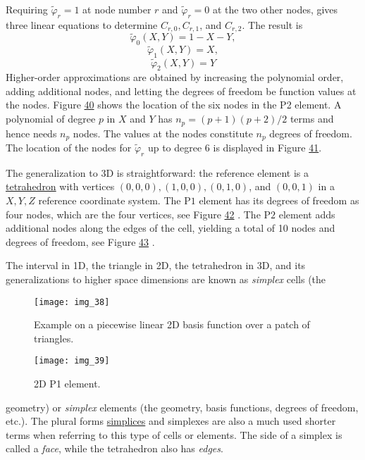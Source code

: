 \documentclass[../main.tex]{subfiles}
\begin{document}
Requiring $\tilde{\varphi}_{r}=1$ at node number $r$ and $\tilde{\varphi}_{r}=0$ at the two other nodes, gives three linear equations to determine $C_{r, 0}, C_{r, 1}$, and $C_{r, 2}$. The result is
\begin{equation}\label{eqa109}
	\tilde{\varphi}_{0}(X, Y)=1-X-Y,
\end{equation}
\begin{equation}\label{eqa110}
	\tilde{\varphi}_{1}(X, Y)=X,
\end{equation}
\begin{equation}\label{eqa111}
	\tilde{\varphi}_{2}(X, Y)=Y
\end{equation}
Higher-order approximations are obtained by increasing the polynomial order, adding additional nodes, and letting the degrees of freedom be function values at the nodes. Figure \hyperref[fig:img_40]{40} shows the location of the six nodes in the P2 element.
A polynomial of degree $p$ in $X$ and $Y$ has $n_{p}=(p+1)(p+2) / 2$ terms and hence needs $n_{p}$ nodes. The values at the nodes constitute $n_{p}$ degrees of freedom. The location of the nodes for $\tilde{\varphi}_{r}$ up to degree 6 is displayed in Figure \hyperref[fig:img_41]{41}.

The generalization to $3 \mathrm{D}$ is straightforward: the reference element is a \href{https://en.wikipedia.org/wiki/Tetrahedron}{tetrahedron} with vertices $(0,0,0),(1,0,0),(0,1,0)$, and $(0,0,1)$ in a $X, Y, Z$ reference coordinate system. The $\mathrm{P} 1$ element has its degrees of freedom as four nodes, which are the four vertices, see Figure \hyperref[fig:img_42]{42} . The $\mathrm{P} 2$ element adds additional nodes along the edges of the cell, yielding a total of 10 nodes and degrees of freedom, see Figure \hyperref[fig:img_43]{43} .

The interval in 1D, the triangle in 2D, the tetrahedron in 3D, and its generalizations to higher space dimensions are known as \textit{simplex} cells (the
\begin{figure}[H]
	\centering
	\texttt{[image: img\_38]}
	\caption{Example on a piecewise linear 2D basis function over a patch of
		triangles.}
	\label{fig:img_38}
\end{figure}
\begin{figure}[H]
	\centering
	\texttt{[image: img\_39]}
	\caption{2D P1 element.}
	\label{fig:img_39}
\end{figure}

\noindent geometry) or \textit{simplex} elements (the geometry, basis functions, degrees of freedom,
etc.). The plural forms \href{https://en.wikipedia.org/wiki/Simplex}{simplices} and simplexes are also a much used shorter
terms when referring to this type of cells or elements. The side of a simplex is
called a \textit{face}, while the tetrahedron also has \textit{edges}.
\end{document}
